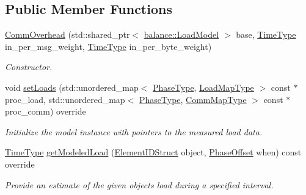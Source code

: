 \subsection*{Public Member Functions}
\begin{DoxyCompactItemize}
\item 
\hyperlink{structvt_1_1vrt_1_1collection_1_1balance_1_1_comm_overhead_af918fee4ae0360d93c19442945e9c3d4}{Comm\+Overhead} (std\+::shared\+\_\+ptr$<$ \hyperlink{structvt_1_1vrt_1_1collection_1_1balance_1_1_load_model}{balance\+::\+Load\+Model} $>$ base, \hyperlink{namespacevt_a876a9d0cd5a952859c72de8a46881442}{Time\+Type} in\+\_\+per\+\_\+msg\+\_\+weight, \hyperlink{namespacevt_a876a9d0cd5a952859c72de8a46881442}{Time\+Type} in\+\_\+per\+\_\+byte\+\_\+weight)
\begin{DoxyCompactList}\small\item\em Constructor. \end{DoxyCompactList}\item 
void \hyperlink{structvt_1_1vrt_1_1collection_1_1balance_1_1_comm_overhead_a5208f7952b3a327ca118e9be2f4c5a55}{set\+Loads} (std\+::unordered\+\_\+map$<$ \hyperlink{namespacevt_a46ce6733d5cdbd735d561b7b4029f6d7}{Phase\+Type}, \hyperlink{namespacevt_1_1vrt_1_1collection_1_1balance_a5339303db2e1ce964d783a53fd74e6b1}{Load\+Map\+Type} $>$ const $\ast$proc\+\_\+load, std\+::unordered\+\_\+map$<$ \hyperlink{namespacevt_a46ce6733d5cdbd735d561b7b4029f6d7}{Phase\+Type}, \hyperlink{namespacevt_1_1vrt_1_1collection_1_1balance_a01ee1fb0ae2da1d2ab7fdca3be9ae351}{Comm\+Map\+Type} $>$ const $\ast$proc\+\_\+comm) override
\begin{DoxyCompactList}\small\item\em Initialize the model instance with pointers to the measured load data. \end{DoxyCompactList}\item 
\hyperlink{namespacevt_a876a9d0cd5a952859c72de8a46881442}{Time\+Type} \hyperlink{structvt_1_1vrt_1_1collection_1_1balance_1_1_comm_overhead_a51e745b5f4a86e04519a9a65dabcb139}{get\+Modeled\+Load} (\hyperlink{namespacevt_1_1vrt_1_1collection_1_1balance_a9f5b53fafb270212279a4757d2c4cd28}{Element\+I\+D\+Struct} object, \hyperlink{structvt_1_1vrt_1_1collection_1_1balance_1_1_phase_offset}{Phase\+Offset} when) const override
\begin{DoxyCompactList}\small\item\em Provide an estimate of the given object\textquotesingle{}s load during a specified interval. \end{DoxyCompactList}\end{DoxyCompactItemize}
